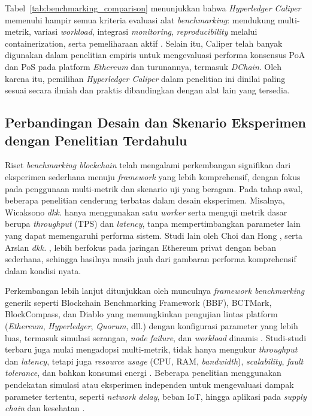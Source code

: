 Tabel~\ref{tab:benchmarking_comparison} menunjukkan bahwa \textit{Hyperledger Caliper} memenuhi hampir semua kriteria evaluasi alat \textit{benchmarking}: mendukung multi-metrik, variasi \textit{workload}, integrasi \textit{monitoring}, \textit{reproducibility} melalui containerization, serta pemeliharaan aktif \cite{fan2020, martinez2022, zheng2019}. Selain itu, Caliper telah banyak digunakan dalam penelitian empiris untuk mengevaluasi performa konsensus PoA dan PoS pada platform \textit{Ethereum} dan turunannya, termasuk \textit{DChain}. Oleh karena itu, pemilihan \textit{Hyperledger Caliper} dalam penelitian ini dinilai paling sesuai secara ilmiah dan praktis dibandingkan dengan alat lain yang tersedia.


\subsection{Perbandingan Desain dan Skenario Eksperimen dengan Penelitian Terdahulu}

Riset \textit{benchmarking blockchain} telah mengalami perkembangan signifikan dari eksperimen sederhana menuju \textit{framework} yang lebih komprehensif, dengan fokus pada penggunaan multi-metrik dan skenario uji yang beragam. Pada tahap awal, beberapa penelitian cenderung terbatas dalam desain eksperimen. Misalnya, Wicaksono \textit{dkk.} hanya menggunakan satu \textit{worker} serta menguji metrik dasar berupa \textit{throughput} (TPS) dan \textit{latency}, tanpa mempertimbangkan parameter lain yang dapat memengaruhi performa sistem. Studi lain oleh Choi dan Hong \cite{choi2020}, serta Arslan \textit{dkk.} \cite{arslan2020}, lebih berfokus pada jaringan Ethereum privat dengan beban sederhana, sehingga hasilnya masih jauh dari gambaran performa komprehensif dalam kondisi nyata.

Perkembangan lebih lanjut ditunjukkan oleh munculnya \textit{framework benchmarking} generik seperti Blockchain Benchmarking Framework (BBF), BCTMark, BlockCompass, dan Diablo yang memungkinkan pengujian lintas platform (\textit{Ethereum}, \textit{Hyperledger}, \textit{Quorum}, dll.) dengan konfigurasi parameter yang lebih luas, termasuk simulasi serangan, \textit{node failure}, dan \textit{workload} dinamis \cite{touloupou2024, saingre2020, rasolroveicy2024, lebedev2024}. Studi-studi terbaru juga mulai mengadopsi multi-metrik, tidak hanya mengukur \textit{throughput} dan \textit{latency}, tetapi juga \textit{resource usage} (CPU, RAM, \textit{bandwidth}), \textit{scalability}, \textit{fault tolerance}, dan bahkan konsumsi energi \cite{fan2020, pradhan2022, li2024, chacko2023}. Beberapa penelitian menggunakan pendekatan simulasi atau eksperimen independen untuk mengevaluasi dampak parameter tertentu, seperti \textit{network delay}, beban IoT, hingga aplikasi pada \textit{supply chain} dan kesehatan \cite{chen2021, longo2019, purusottama2024, kuo2021}.

